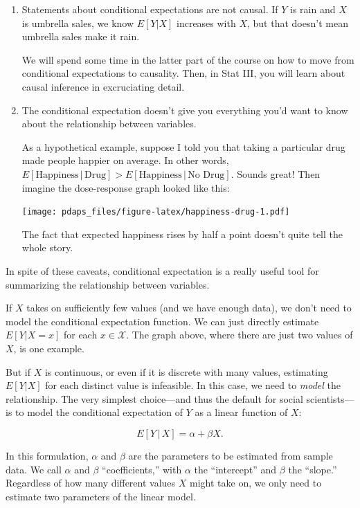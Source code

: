 \documentclass[12pt,oneside,openany]{book}
\begin{document}
\begin{enumerate}
\def\labelenumi{\arabic{enumi}.}
\item
  Statements about conditional expectations are not causal. If \(Y\) is
  rain and \(X\) is umbrella sales, we know \(E[Y | X]\) increases with
  \(X\), but that doesn't mean umbrella sales make it rain.

  We will spend some time in the latter part of the course on how to
  move from conditional expectations to causality. Then, in Stat III,
  you will learn about causal inference in excruciating detail.
\item
  The conditional expectation doesn't give you everything you'd want to
  know about the relationship between variables.

  As a hypothetical example, suppose I told you that taking a particular
  drug made people happier on average. In other words,
  \(E[\text{Happiness} \,|\, \text{Drug}] > E[\text{Happiness} \,|\, \text{No Drug}]\).
  Sounds great! Then imagine the dose-response graph looked like this:

  \texttt{[image: pdaps\_files/figure-latex/happiness-drug-1.pdf]}

  The fact that expected happiness rises by half a point doesn't quite
  tell the whole story.
\end{enumerate}

In spite of these caveats, conditional expectation is a really useful
tool for summarizing the relationship between variables.

If \(X\) takes on sufficiently few values (and we have enough data), we
don't need to model the conditional expectation function. We can just
directly estimate \(E[Y | X = x]\) for each \(x \in \mathcal{X}\). The
graph above, where there are just two values of \(X\), is one example.

But if \(X\) is continuous, or even if it is discrete with many values,
estimating \(E[Y | X]\) for each distinct value is infeasible. In this
case, we need to \emph{model} the relationship. The very simplest
choice---and thus the default for social scientists---is to model the
conditional expectation of \(Y\) as a linear function of \(X\):

\begin{equation}
E[Y \,|\, X] = \alpha + \beta X.
\end{equation}

In this formulation, \(\alpha\) and \(\beta\) are the parameters to be
estimated from sample data. We call \(\alpha\) and \(\beta\)
``coefficients,'' with \(\alpha\) the ``intercept'' and \(\beta\) the
``slope.'' Regardless of how many different values \(X\) might take on,
we only need to estimate two parameters of the linear model.
\end{document}
